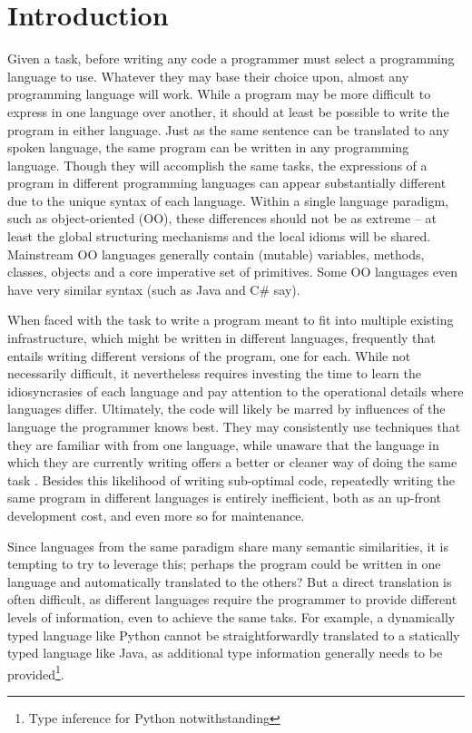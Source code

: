 \documentclass[sigplan,review,anonymous]{acmart}
\begin{document}
\section{Introduction}

Given a task, before writing any code a programmer must select a programming 
language to use. Whatever they may base their choice upon, almost any
programming language will work. While a program may be more difficult to
express in one language over another, it should at least be possible to write
the program in either language. Just as the same sentence can be translated to
any spoken language, the same program can be written in any programming
language. Though they will accomplish the same tasks, the
expressions of a program in different programming languages can appear
substantially different due to the unique syntax of each language. Within a
single language paradigm, such as object-oriented (OO),
these differences should not be as extreme -- at least the global structuring
mechanisms and the local idioms will be shared.  Mainstream OO languages
generally contain (mutable) variables, methods, classes, objects and a core
imperative set of primitives. Some OO languages even have very similar syntax
(such as Java and C\# say).

When faced with the task to write a program meant to fit into multiple existing
infrastructure, which might be written in different languages, frequently that
entails writing different versions of the program, one for each. While not
necessarily difficult, it nevertheless
requires investing the time to learn the idiosyncrasies of each language and 
pay attention to the operational details where languages differ. Ultimately, 
the code will likely be marred by influences of the language the programmer 
knows best. They may consistently use techniques that they are familiar with 
from one language, while unaware that the language in which they are currently 
writing offers a better or cleaner way of doing the same task 
\cite{scholtz1990learning, alexandron2012effect}. Besides this 
likelihood of writing sub-optimal code, repeatedly writing the same program in 
different languages is entirely inefficient, both as an up-front development cost,
and even more so for maintenance.

Since languages from the same paradigm share many semantic similarities,
it is tempting to try to leverage this; perhaps the program could be written in
one language and
automatically translated to the others?  But a direct translation is often
difficult, as different languages require the programmer to provide different
levels of information, even to achieve the same taks.  For example, a dynamically
typed language like Python
cannot be straightforwardly translated to a statically typed 
language like Java, as additional type information generally needs to be 
provided\footnote{Type inference for Python notwithstanding}.
\end{document}
